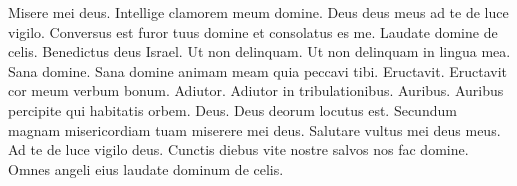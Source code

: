 \begin{multicols*}{2}
 Misere mei deus.
 Intellige clamorem meum domine.
 Deus deus meus ad te de luce vigilo.
 Conversus est furor tuus domine et consolatus es me.
 Laudate domine de celis.
 Benedictus deus Israel.
 Ut non delinquam.
 Ut non delinquam in lingua mea.
 Sana domine.
 Sana domine animam meam quia peccavi tibi.
 Eructavit.
 Eructavit cor meum verbum bonum.
 Adiutor.
 Adiutor in tribulationibus.
 Auribus.
 Auribus percipite qui habitatis orbem.
 Deus.
 Deus deorum locutus est.
 Secundum magnam misericordiam tuam miserere mei deus.
 Salutare vultus mei deus meus.
 Ad te de luce vigilo deus.
 Cunctis diebus vite nostre salvos nos fac domine.
 Omnes angeli eius laudate dominum de celis.

\end{multicols*}
